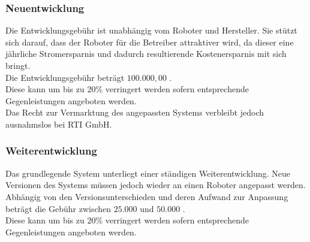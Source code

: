 \subsubsection{Neuentwicklung}
Die Entwicklungsgebühr ist unabhängig vom Roboter und Hersteller. Sie stützt sich darauf, dass der Roboter für die Betreiber attraktiver wird, da dieser eine jährliche Stromersparnis und dadurch resultierende Kostenersparnis mit sich bringt.\\
Die Entwicklungsgebühr beträgt $100.000,00$ \officialeuro.\\
Diese kann um bis zu $20$\% verringert werden sofern entsprechende Gegenleistungen angeboten werden.\\
Das Recht zur Vermarktung des angepassten Systems verbleibt jedoch ausnahmslos bei \textsf{RTI GmbH}.

\subsubsection{Weiterentwicklung}
Das grundlegende System unterliegt einer ständigen Weiterentwicklung. Neue Versionen des Systems müssen jedoch wieder an einen Roboter angepasst werden. Abhängig von den Versionsunterschieden und deren Aufwand zur Anpassung beträgt die Gebühr zwischen $25.000$ und $50.000$ \officialeuro.\\
Diese kann um bis zu $20$\% verringert werden sofern entsprechende Gegenleistungen angeboten werden.


